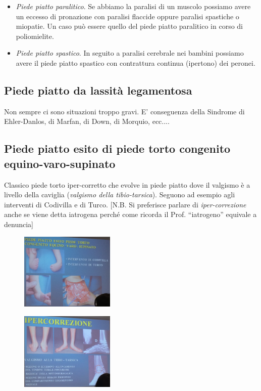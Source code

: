 \begin{itemize}
\item
  \emph{Piede piatto paralitico}. Se abbiamo la paralisi di un muscolo possiamo avere un eccesso di pronazione con paralisi flaccide oppure paralisi spastiche o miopatie. Un caso può essere quello del piede piatto paralitico in corso di poliomielite.
\item
  \emph{Piede piatto spastico}. In seguito a paralisi cerebrale nei bambini possiamo avere il piede piatto spastico con contrattura continua (ipertono) dei peronei.
\end{itemize}

\subsection{Piede piatto da lassità legamentosa}

Non sempre ci sono situazioni troppo gravi. E' conseguenza della Sindrome di Ehler-Danlos, di Marfan, di Down, di Morquio, ecc....

\subsection{Piede piatto esito di piede torto congenito equino-varo-supinato}

Classico piede torto iper-corretto che evolve in piede piatto dove il valgismo è a livello della caviglia (\emph{valgismo della tibio-tarsica}). Seguono ad esempio agli interventi di Codivilla e di Turco. {[}N.B. Si preferisce parlare di \emph{iper-correzione} anche se viene detta iatrogena perché come ricorda il Prof. ``iatrogeno'' equivale a denuncia{]}

\begin{figure}[!ht]
\centering
\includegraphics[width=0.4\textwidth]{014/image13.jpeg}
\end{figure}

\begin{figure}[!ht]
\centering
\includegraphics[width=0.4\textwidth]{014/image14.jpeg}
\end{figure}

